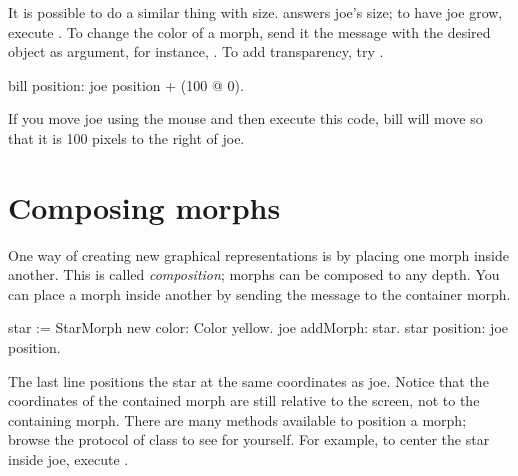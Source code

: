 \documentclass[a4paper,10pt,twoside]{book}
\begin{document}
It is possible to do a similar thing with size.
  answers joe's size; to have joe grow, execute .
To change the color of a morph, send it the  message with the desired  object as argument, for instance, .
To add transparency, try .

\begin{code}{}
bill position: joe position + (100 @ 0).
\end{code}
\noindent
If you move joe using the mouse and then execute this code, bill will move so that it is 100 pixels to the right of joe.

\section{Composing morphs}

One way of creating new graphical representations is by placing one morph inside another.
This is called \emph{composition}; morphs can be composed to any depth.
%
You can place a morph inside another by sending the message  to the container morph.

\begin{code}{}
star := StarMorph new color: Color yellow.
joe addMorph: star.
star position: joe position.
\end{code}

\noindent
The last line positions the star at the same coordinates as joe.
Notice that the coordinates of the contained morph are still relative to the screen, not to the containing morph.
There are many  methods available to position a morph; browse the  protocol of class  to see for yourself.
For example, to center the star inside joe, execute   .
\end{document}
